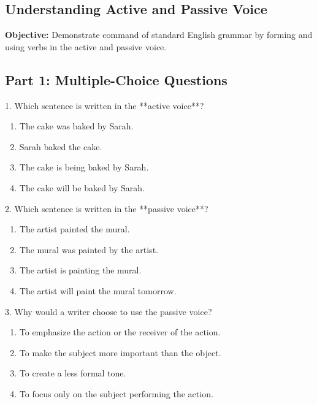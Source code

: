 \documentclass[12pt]{article}
\begin{document}
\subsection*{Understanding Active and Passive Voice}
\onehalfspacing

\begin{tcolorbox}[colframe=black!40, colback=gray!0, title=Learning Objective]
\textbf{Objective:} Demonstrate command of standard English grammar by forming and using verbs in the active and passive voice.
\end{tcolorbox}

\subsection*{Part 1: Multiple-Choice Questions}

1. Which sentence is written in the **active voice**?  
\begin{enumerate}[label=\Alph*.]
    \item The cake was baked by Sarah.  
    \item Sarah baked the cake.  
    \item The cake is being baked by Sarah.  
    \item The cake will be baked by Sarah.  
\end{enumerate}

\vspace{1cm}

2. Which sentence is written in the **passive voice**?  
\begin{enumerate}[label=\Alph*.]
    \item The artist painted the mural.  
    \item The mural was painted by the artist.  
    \item The artist is painting the mural.  
    \item The artist will paint the mural tomorrow.  
\end{enumerate}

\vspace{1cm}

3. Why would a writer choose to use the passive voice?  
\begin{enumerate}[label=\Alph*.]
    \item To emphasize the action or the receiver of the action.  
    \item To make the subject more important than the object.  
    \item To create a less formal tone.  
    \item To focus only on the subject performing the action.  
\end{enumerate}
\end{document}
